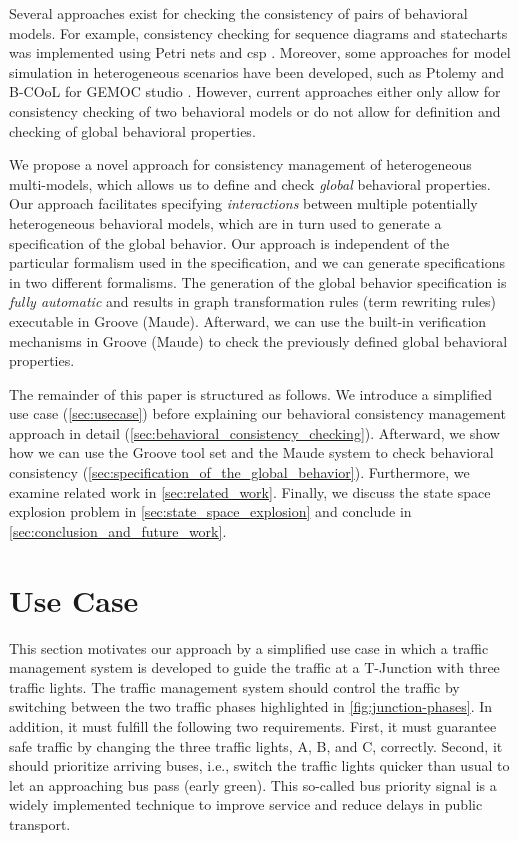 \documentclass{jot}
\begin{document}
Several approaches exist for checking the consistency of pairs of behavioral models.
For example, consistency checking for sequence diagrams and statecharts was implemented using Petri nets \cite{yaoConsistencyCheckingUML2006} and \gls*{csp} \cite{kusterExplicitBehavioralConsistency2003}.
Moreover, some approaches for model simulation in heterogeneous scenarios have been developed, such as Ptolemy \cite{ekerTamingHeterogeneityPtolemy2003, leeDisciplinedHeterogeneousModeling2010} and B-COoL for GEMOC studio \cite{varalarsenBehavioralCoordinationOperator2015}.
However, current approaches either only allow for consistency checking of two behavioral models or do not allow for definition and checking of global behavioral properties.

We propose a novel approach for consistency management of heterogeneous multi-models, which allows us to define and check \emph{global} behavioral properties.
Our approach facilitates specifying \emph{interactions} between multiple potentially heterogeneous behavioral models, which are in turn used to generate a specification of the global behavior.
Our approach is independent of the particular formalism used in the specification, and we can generate specifications in two different formalisms.
The generation of the global behavior specification is \emph{fully automatic} and results in graph transformation rules (term rewriting rules) executable in Groove (Maude).
Afterward, we can use the built-in verification mechanisms in Groove (Maude) to check the previously defined global behavioral properties.

The remainder of this paper is structured as follows.
We introduce a simplified use case (\autoref{sec:usecase}) before explaining our behavioral consistency management approach in detail (\autoref{sec:behavioral_consistency_checking}).
Afterward, we show how we can use the Groove tool set and the Maude system to check behavioral consistency (\autoref{sec:specification_of_the_global_behavior}).
Furthermore, we examine related work in \autoref{sec:related_work}.
Finally, we discuss the state space explosion problem in \autoref{sec:state_space_explosion} and conclude in \autoref{sec:conclusion_and_future_work}.


\section{Use Case} \label{sec:usecase}
This section motivates our approach by a simplified use case in which a traffic management system is developed to guide the traffic at a T-Junction with three traffic lights.
The traffic management system should control the traffic by switching between the two traffic phases highlighted in \cref{fig:junction-phases}.
In addition, it must fulfill the following two requirements.
First, it must guarantee safe traffic by changing the three traffic lights, A, B, and C, correctly.
Second, it should prioritize arriving buses, i.e., switch the traffic lights quicker than usual to let an approaching bus pass (early green).
This so-called bus priority signal is a widely implemented technique to improve service and reduce delays in public transport.
\end{document}
